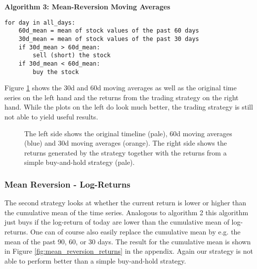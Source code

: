 \vspace{2ex}
\textbf{\small{Algorithm 3: Mean-Reversion Moving Averages}}
\vspace{-1ex}
\begin{verbatim}
for day in all_days: 
    60d_mean = mean of stock values of the past 60 days
    30d_mean = mean of stock values of the past 30 days
    if 30d_mean > 60d_mean:
        sell (short) the stock
    if 30d_mean < 60d_mean:
        buy the stock
\end{verbatim}

Figure \ref{fig:30d_60d_plot} shows the 30d and 60d moving averages as well as the original time series on the left hand and the returns from the trading strategy on the right hand. While the plots on the left do look much better, the trading strategy is still not able to yield useful results. 
\begin{figure}[h!]
    \centering
    \begin{minipage}[b]{0.49\textwidth}
        \centering
            \begin{adjustbox}{width=\textwidth,center}
               
            \end{adjustbox}
    \end{minipage}
    \hfill
    \begin{minipage}[b]{0.49\textwidth}
        \centering
        \begin{adjustbox}{width=\textwidth,center, scale={1}{1.2}}
            
        \end{adjustbox}
    \end{minipage}
    \caption{The left side shows the original timeline (pale), 60d moving averages (blue) and 30d moving averages (orange). The right side shows the returns generated by the strategy together with the returns from a simple buy-and-hold strategy (pale).}
    \label{fig:30d_60d_plot}
\end{figure}{}

\subsubsection{Mean Reversion - Log-Returns}
The second strategy looks at whether the current return is lower or higher than the cumulative mean of the time series. Analogous to algorithm 2 this algorithm just buys if the log-return of today are lower than the cumulative mean of log-returns. One can of course also easily replace the cumulative mean by e.g. the mean of the past 90, 60, or 30 days. The result for the cumulative mean is shown in Figure \ref{fig:mean_reversion_returns} in the appendix. Again our strategy is not able to perform better than a simple buy-and-hold strategy. 

